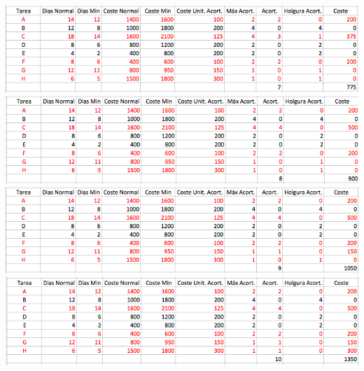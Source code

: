 \documentclass[10pt, a4paper,spanish]{article}
\begin{document}
	\includegraphics[width=\textwidth]{table-09}
	\includegraphics[width=\textwidth]{table-10}
	\includegraphics[width=\textwidth]{table-11}
	\includegraphics[width=\textwidth]{table-12}
\end{document}
